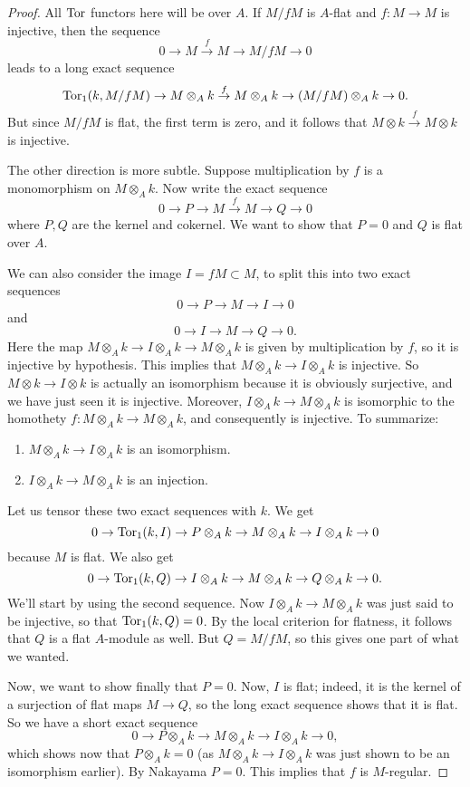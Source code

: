 \begin{proof} All $\operatorname{Tor}$ functors here will be over $A$. 
If $M/fM$ is $A$-flat and $f: M \to M$ is injective, then the sequence
\[ 0 \to M \stackrel{f}{\to} M \to M/fM \to 0 \]
leads to a long exact sequence
\[ \operatorname{Tor}_1(k, M/fM) \to M \otimes_A k \stackrel{f}{\to} M \otimes_A k \to (M/fM)
\otimes_A k \to 0. \]
But since $M/fM$ is flat, the first term is zero, and  it follows that $M \otimes k \stackrel{f}{\to} M
\otimes k$ is injective.

The other direction is more subtle. Suppose multiplication by $f$ is a
monomorphism on $M \otimes_A k$. Now write the exact sequence
\[ 0 \to P \to M \stackrel{f}{\to} M \to Q \to 0 \]
where $P, Q$ are the kernel and cokernel. We want to show that $P = 0$
and $Q$ is flat over $A$.

We can also consider the image $I = fM \subset M$, to split this into two
exact sequences
\[ 0 \to P \to M \to I \to 0  \]
and 
\[ 0 \to I \to M \to Q \to 0.  \]
Here the map $M \otimes_A k \to I \otimes_A k \to M \otimes_A k$ is given by
multiplication by $f$, so it is injective by hypothesis. This implies
that $M \otimes_A k \to I
\otimes_A k$ is injective. So $M \otimes k \to I \otimes k$ is actually an isomorphism because it
is obviously surjective, and we have just seen it is injective.
Moreover, $I \otimes_A k \to M \otimes_A k$ is isomorphic to the
homothety $f: M \otimes_A k \to M \otimes_A k$, and consequently is
injective.
To summarize:
\begin{enumerate}
\item $M \otimes_A k \to I \otimes_A k$ is an isomorphism. 
\item $I \otimes_A k \to M \otimes_A k$ is an injection.
\end{enumerate}

Let us tensor these two exact sequences with $k$. We get
\[ 0 \to  \operatorname{Tor}_1(k, I) \to P \otimes_A k \to M  \otimes_A k \to I \otimes_A k \to 0   \]
because $M$ is flat. We also get
\[ 0 \to  \operatorname{Tor}_1(k, Q) \to I \otimes_A k \to M  \otimes_A k \to Q \otimes_A k \to 0
.\]
We'll start by using the second sequence. Now $I \otimes_A k \to M
\otimes_A k$
was just said to be injective, so that $\operatorname{Tor}_1(k, Q) = 0$. By the local
criterion for flatness, it follows that $Q$ is a flat 
$A$-module as well. 
But $Q = M/fM$, so this gives one part of what we wanted.

Now, we want to show finally that $P = 0$. 
Now, $I$ is flat; indeed, it is the kernel of a surjection of flat maps $M \to
Q$, so the long exact sequence shows that it is flat. So we have a short exact
sequence
\[ 0 \to P \otimes_A k \to M \otimes_A k \to I \otimes_A k \to 0,  \]
which shows now that $P \otimes_A k  = 0$ (as $M \otimes_A k \to I \otimes_A k$ was
just shown to be an isomorphism earlier). By Nakayama $P = 0$.
This implies that $f$ is $M$-regular.
\end{proof}

